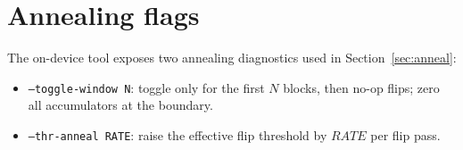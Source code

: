 \documentclass{article} %
\begin{document}
\section{Annealing flags}
\label{app:flags}
The on-device tool exposes two annealing diagnostics used in Section~\ref{sec:anneal}:
\begin{itemize}
\item \texttt{--toggle-window N}: toggle only for the first $N$ blocks, then no-op flips; zero all accumulators at the boundary.
\item \texttt{--thr-anneal RATE}: raise the effective flip threshold by $RATE$ per flip pass.
\end{itemize}
\end{document}
